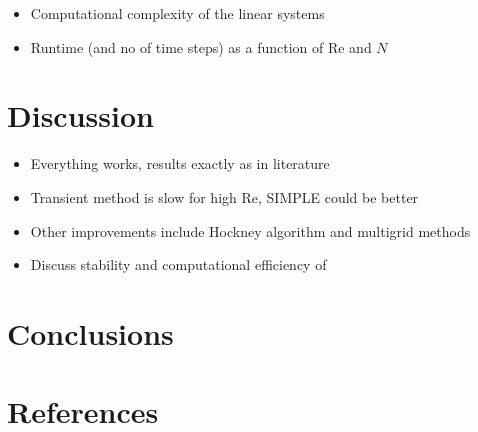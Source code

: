\documentclass[final,3p,twocolumn]{elsarticle}
\begin{document}
\begin{itemize}
    \item Computational complexity of the linear systems
    \item Runtime (and no of time steps) as a function of Re and $N$
\end{itemize}

\section{Discussion}
\label{sec:discussion}

\begin{itemize}
    \item Everything works, results exactly as in literature
    \item Transient method is slow for high Re, SIMPLE could be better
    \item Other improvements include Hockney algorithm and multigrid methods
    \item Discuss stability and computational efficiency of
\end{itemize}

\section{Conclusions}
\label{sec:conclusion}


\section*{References}


\end{document}
